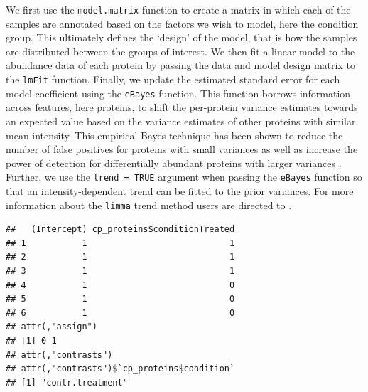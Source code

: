 \documentclass[9pt,a4paper,]{extarticle}
\newenvironment{Shaded}{\begin{snugshade}}{\end{snugshade}}
\newcommand{\DocumentationTok}[1]{\textcolor[rgb]{0.56,0.35,0.01}{\textbf{\textit{#1}}}}
\newcommand{\FunctionTok}[1]{\textcolor[rgb]{0.13,0.29,0.53}{\textbf{#1}}}
\newcommand{\NormalTok}[1]{#1}
\newcommand{\OtherTok}[1]{\textcolor[rgb]{0.56,0.35,0.01}{#1}}
\newcommand{\SpecialCharTok}[1]{\textcolor[rgb]{0.81,0.36,0.00}{\textbf{#1}}}
\begin{document}
We first use the \texttt{model.matrix} function to create a matrix in which each of the
samples are annotated based on the factors we wish to model, here the condition
group. This ultimately defines the `design' of the model, that is how the
samples are distributed between the groups of interest. We then fit a linear
model to the abundance data of each protein by passing the data and model design
matrix to the \texttt{lmFit} function. Finally, we update the estimated standard error
for each model coefficient using the \texttt{eBayes} function. This function borrows
information across features, here proteins, to shift the per-protein variance
estimates towards an expected value based on the variance estimates of other
proteins with similar mean intensity. This empirical Bayes technique has been
shown to reduce the number of false positives for proteins with small variances
as well as increase the power of detection for differentially abundant proteins
with larger variances \citep{Phipson2016}. Further, we use the \texttt{trend\ =\ TRUE} argument
when passing the \texttt{eBayes} function so that an intensity-dependent trend can be
fitted to the prior variances. For more information about the \texttt{limma} trend
method users are directed to \citep{Law2014}.

\begin{Shaded}
\end{Shaded}

\begin{verbatim}
##   (Intercept) cp_proteins$conditionTreated
## 1           1                            1
## 2           1                            1
## 3           1                            1
## 4           1                            0
## 5           1                            0
## 6           1                            0
## attr(,"assign")
## [1] 0 1
## attr(,"contrasts")
## attr(,"contrasts")$`cp_proteins$condition`
## [1] "contr.treatment"
\end{verbatim}
\end{document}
